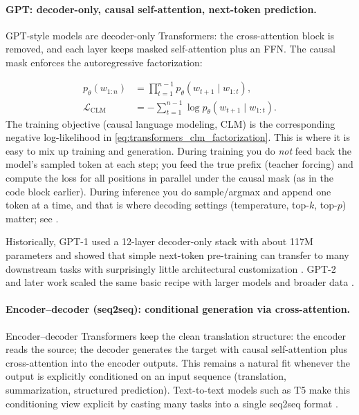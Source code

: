 \paragraph{GPT: decoder-only, causal self-attention, next-token prediction.}
\begin{sloppypar}
GPT-style models are decoder-only Transformers: the cross-attention block is removed, and each layer keeps masked self-attention plus an FFN. The causal mask enforces the autoregressive factorization:
\end{sloppypar}
\begin{equation}
    \begin{aligned}
        p_\theta(w_{1:n}) &= \prod_{t=1}^{n-1} p_\theta\!\left(w_{t+1}\mid w_{1:t}\right),\\
        \mathcal{L}_{\text{CLM}} &= -\sum_{t=1}^{n-1} \log p_\theta\!\left(w_{t+1}\mid w_{1:t}\right).
    \end{aligned}
    \label{eq:transformers_clm_factorization}
\end{equation}
The training objective (causal language modeling, CLM) is the corresponding negative log-likelihood in \eqref{eq:transformers_clm_factorization}.
This is where it is easy to mix up training and generation. During training you do \emph{not} feed back the model's sampled token at each step; you feed the true prefix (teacher forcing) and compute the loss for all positions in parallel under the causal mask (as in the code block earlier). During inference you do sample/argmax and append one token at a time, and that is where decoding settings (temperature, top-\(k\), top-\(p\)) matter; see .

Historically, GPT-1 used a 12-layer decoder-only stack with about 117M parameters and showed that simple next-token pre-training can transfer to many downstream tasks with surprisingly little architectural customization \citep{Radford2018}. GPT-2 and later work scaled the same basic recipe with larger models and broader data \citep{Radford2019,Brown2020}.

\paragraph{Encoder--decoder (seq2seq): conditional generation via cross-attention.}
Encoder--decoder Transformers keep the clean translation structure: the encoder reads the source; the decoder generates the target with causal self-attention plus cross-attention into the encoder outputs. This remains a natural fit whenever the output is explicitly conditioned on an input sequence (translation, summarization, structured prediction). Text-to-text models such as T5 make this conditioning view explicit by casting many tasks into a single seq2seq format \citep{Raffel2020}.

